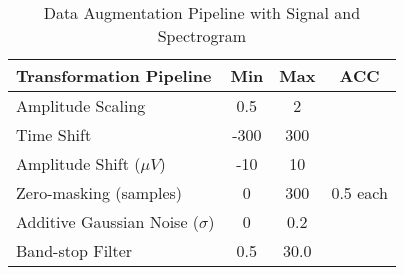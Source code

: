 \begin{table}[ht]
\centering
\caption{Data Augmentation Pipeline with Signal and Spectrogram}
\label{table6}
\begin{tabular}{lccc}
\hline
\textbf{Transformation Pipeline} & \textbf{Min} & \textbf{Max} & \textbf{ACC} \\
\hline
Amplitude Scaling & 0.5 & 2 & \\
Time Shift & -300 & 300 & \\
Amplitude Shift (\(\mu V\)) & -10 & 10 & \\
Zero-masking (samples) & 0 & 300 & 0.5 each \\
Additive Gaussian Noise (\(\sigma\)) & 0 & 0.2 & \\
Band-stop Filter & 0.5 & 30.0 & \\
\hline
\end{tabular}
\end{table}
